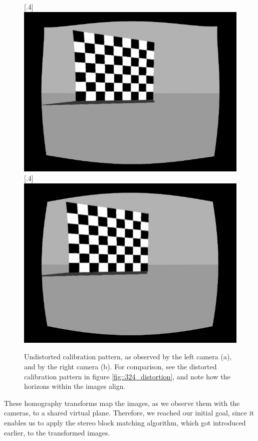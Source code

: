 \begin{figure}[h]
	\centering
	\subcaptionbox{}%
	[.4\linewidth]{\includegraphics[scale=.2]{chapters/03_background/img/gazebo_rectified_left.jpg}}
	\subcaptionbox{}%
	[.4\linewidth]{\includegraphics[scale=.2]{chapters/03_background/img/gazebo_rectified_right.jpg}}
	\caption{Undistorted calibration pattern, as observed by the left camera (a), and by the right camera (b). For comparison, see the distorted calibration pattern in figure \ref{fig::324_distortion}, and note how the horizons within the images align.}
	\label{fig::324_rectified}
\end{figure}
These homography transforms map the images, as we observe them with the cameras, to a shared virtual plane. Therefore, we reached our initial goal, since it enables us to apply the stereo block matching algorithm, which got introduced earlier, to the transformed images.